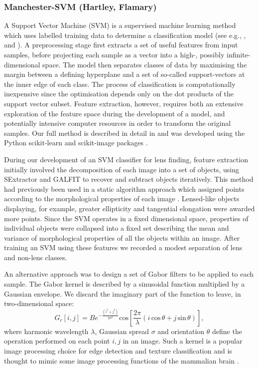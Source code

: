 \documentclass{aa}
\begin{document}
\subsubsection{Manchester-SVM (Hartley, Flamary)}
\label{sec:Gabor-SVM}

A Support Vector Machine (SVM) is a supervised machine learning method which uses labelled training data to determine a classification model (see e.g., \citet{vapnik79estimation}, \citet{Cortes1995} and \citet{Burges1998}). A preprocessing stage first extracts a set of useful features from input samples, before projecting each sample as a vector into a high-, possibly infinite-dimensional space. The model then separates classes of data by maximising the margin between a defining hyperplane and a set of so-called support-vectors at the inner edge of each class. The process of classification is computationally inexpensive since the optimisation depends only on the dot products of the support vector subset. Feature extraction, however,  requires both an extensive exploration of the feature space during the development of a model, and potentially intensive computer resources in order to transform the original samples. Our full method is described in detail in \citet{hartley2017support} and was developed using the Python scikit-learn and scikit-image packages \citep{scikit-learn,scikit-image}.

During our development of an SVM classifier for lens finding, feature extraction initially involved the decomposition of each image into a set of objects, using SExtractor \citep{1996AandAS..117..393B} and GALFIT \citep{2002AJ....124..266P} to recover and subtract objects iteratively. This method had previously been used in a static algorithm approach which assigned points according to the morphological properties of each image \citep[see][]{2014AandA...566A..63J}. Lensed-like objects displaying, for example, greater ellipticity and tangential elongation were awarded more points. Since the SVM operates in a fixed dimensional space,  properties of individual objects were collapsed into a fixed set describing the mean and variance of morphological properties of all the objects within an image. After training an SVM using these features we recorded a modest separation of lens and non-lens classes.

An alternative approach was to design a set of Gabor filters to be applied to each sample. The Gabor kernel is described by a sinusoidal function multiplied by a Gaussian envelope. We discard the imaginary part of the function to leave, in two-dimensional space:
\begin{equation}
G_c[i,j]=Be^{-\frac{(i^2+j^2)}{2\sigma^2}} \mathrm{cos}\left[\frac{2\pi}{\lambda} (i\, \mathrm{cos} \, \theta + j\, \mathrm{sin} \,\theta)\right],
\end{equation}
where harmonic wavelength $\lambda$, Gaussian spread  $\sigma$ and orientation $\theta$ define the operation performed on each point $i,j$ in an image. Such a kernel is a popular image processing choice for edge detection and texture classification \citep[e.g.][]{Springer-verlag97computationalmodels,Feichtinger98a} and is thought to mimic some image processing functions of the mammalian brain \citep{Jones1233}.
\end{document}

